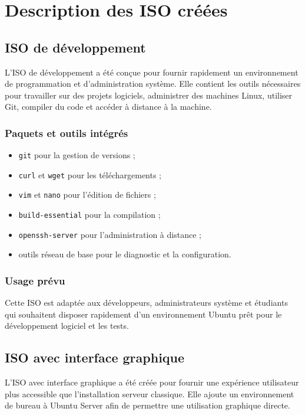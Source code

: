\documentclass[12pt,a4paper]{article}
\begin{document}
\section{Description des ISO créées}

\subsection{ISO de développement}

L'ISO de développement a été conçue pour fournir rapidement un environnement de programmation et d'administration système. Elle contient les outils nécessaires pour travailler sur des projets logiciels, administrer des machines Linux, utiliser Git, compiler du code et accéder à distance à la machine.

\subsubsection*{Paquets et outils intégrés}

\begin{itemize}[label=--]
    \item \texttt{git} pour la gestion de versions ;
    \item \texttt{curl} et \texttt{wget} pour les téléchargements ;
    \item \texttt{vim} et \texttt{nano} pour l'édition de fichiers ;
    \item \texttt{build-essential} pour la compilation ;
    \item \texttt{openssh-server} pour l'administration à distance ;
    \item outils réseau de base pour le diagnostic et la configuration.
\end{itemize}

\subsubsection*{Usage prévu}

Cette ISO est adaptée aux développeurs, administrateurs système et étudiants qui souhaitent disposer rapidement d'un environnement Ubuntu prêt pour le développement logiciel et les tests.

\subsection{ISO avec interface graphique}

L'ISO avec interface graphique a été créée pour fournir une expérience utilisateur plus accessible que l'installation serveur classique. Elle ajoute un environnement de bureau à Ubuntu Server afin de permettre une utilisation graphique directe.
\end{document}

